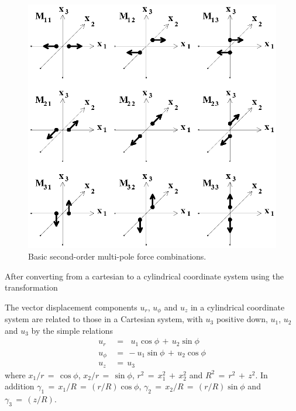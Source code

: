 \documentclass{article}
\begin{document}
\begin{figure}
\begin{center}
\includegraphics[scale=0.7]{Figures/nFIG4.eps}
\end{center}
\caption{ Basic second-order multi-pole force combinations.}
\label{F5_1}
\end{figure}

After converting from a cartesian to a cylindrical coordinate system using the transformation

The vector displacement components $ u_r $, $ u_{\phi} $ and $ u_z $
in a cylindrical coordinate system are related to those in a Cartesian system, with $u_3$ positive down,
$ u_1 $, $ u_2 $ and $ u_3 $ by the simple relations
\begin{align*}
u_r  \,&=\, \ \   u_1 \cos \phi \,+\, u_2 \sin \phi \\
u_{\phi}  \,&=\, -  u_1 \sin \phi  \,+\, u_2 \cos \phi \\
u_z  \,&=\, u_3
\end{align*}
where
$ x_1 / r \,=\, \cos \phi $, $ x_2  / r \,=\, \sin \phi $,
$ r^2 \,=\, x_1^2 \,+\, x_2^2 $ and
$ R^2 \,=\, r^2 \,+\, z^2 $. In addition
$ \gamma_1 \,=\, x_1 / R \,=\, ( r / R ) \cos \phi$, 
$ \gamma_2 \,=\, x_2 / R \,=\, ( r / R ) \sin \phi $ and $ \gamma_3 \,=\, ( z / R ) $.
\end{document}
